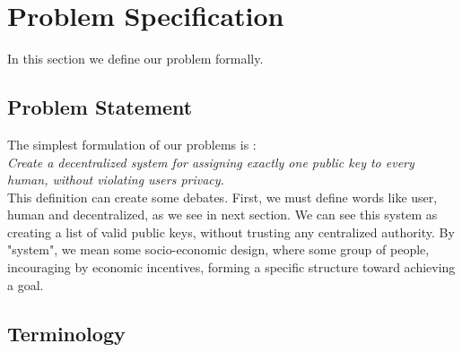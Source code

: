 \documentclass{article}
\begin{document}
\section{ Problem Specification}
In this section we define our problem formally.

\subsection{Problem Statement}
The simplest formulation of our problems is : \\
\textit{Create a decentralized system for assigning exactly one public key to every human, without violating users privacy. }
\\
This definition can create some debates. First, we must define words like user, human and decentralized, as we see in next section. We can see this system as creating a list of valid public keys, without trusting any centralized authority. By "system", we mean some socio-economic design, where some group of people, incouraging by economic incentives, forming a specific structure toward achieving a goal. 

\subsection{Terminology}
\end{document}
